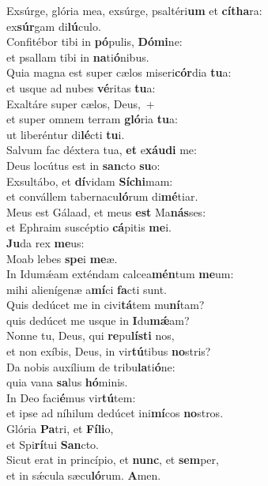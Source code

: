\evenverse Exsúrge, glória mea, exsúrge, psaltéri\textbf{um} et \textbf{cí}\textbf{tha}ra:~\*\\
\evenverse ex\textbf{súr}gam di\textbf{lú}culo.\\
\oddverse Confitébor tibi in \textbf{pó}pulis, \textbf{Dó}\textbf{mi}ne:~\*\\
\oddverse et psallam tibi in \textbf{na}ti\textbf{ó}nibus.\\
\evenverse Quia magna est super cælos miseri\textbf{cór}dia \textbf{tu}a:~\*\\
\evenverse et usque ad nubes \textbf{vé}ritas \textbf{tu}a:\\
\oddverse Exaltáre super cælos, Deus,~+\\
\oddverse  et super omnem terram \textbf{gló}ria \textbf{tu}a:~\*\\
\oddverse ut liberéntur di\textbf{lé}cti \textbf{tu}i.\\
\evenverse Salvum fac déxtera tua, \textbf{et} e\textbf{xáu}\textbf{di} me:~\*\\
\evenverse Deus locútus est in \textbf{san}cto \textbf{su}o:\\
\oddverse Exsultábo, et \textbf{dí}vidam \textbf{Sí}\textbf{chi}mam:~\*\\
\oddverse et convállem tabernacu\textbf{ló}rum di\textbf{mé}tiar.\\
\evenverse Meus est Gálaad, et meus \textbf{est} Ma\textbf{nás}ses:~\*\\
\evenverse et Ephraim suscéptio \textbf{cá}pitis \textbf{me}i.\\
\oddverse \textbf{Ju}da rex \textbf{me}us:~\*\\
\oddverse Moab lebes \textbf{spe}i \textbf{me}æ.\\
\evenverse In Idumǽam exténdam calcea\textbf{mén}tum \textbf{me}um:~\*\\
\evenverse mihi alienígenæ a\textbf{mí}ci \textbf{fa}cti sunt.\\
\oddverse Quis dedúcet me in civi\textbf{tá}tem mu\textbf{ní}tam?~\*\\
\oddverse quis dedúcet me usque in \textbf{I}du\textbf{mǽ}am?\\
\evenverse Nonne tu, Deus, qui \textbf{re}pu\textbf{lí}\textbf{sti} nos,~\*\\
\evenverse et non exíbis, Deus, in vir\textbf{tú}tibus \textbf{no}stris?\\
\oddverse Da nobis auxílium de tribu\textbf{la}ti\textbf{ó}ne:~\*\\
\oddverse quia vana \textbf{sa}lus \textbf{hó}minis.\\
\evenverse In Deo faci\textbf{é}mus vir\textbf{tú}tem:~\*\\
\evenverse et ipse ad níhilum dedúcet ini\textbf{mí}cos \textbf{no}stros.\\
\oddverse Glória \textbf{Pa}tri, et \textbf{Fí}\textbf{li}o,~\*\\
\oddverse et Spi\textbf{rí}tui \textbf{San}cto.\\
\evenverse Sicut erat in princípio, et \textbf{nunc}, et \textbf{sem}per,~\*\\
\evenverse et in sǽcula sæcu\textbf{ló}rum. \textbf{A}men.\\
